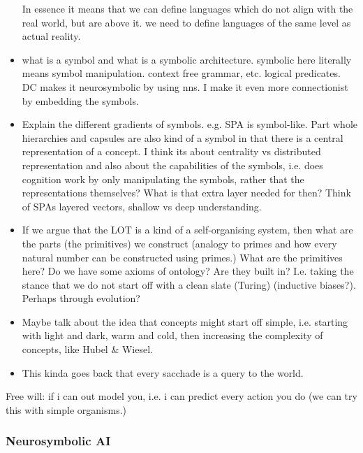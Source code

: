 \begin{itemize}
    In essence it means that we can define languages which do not align with the real world, but are above it. we need to define languages of the same level as actual reality. 
    \item what is a symbol and what is a symbolic architecture. symbolic here literally means symbol manipulation. context free grammar, etc. logical predicates. DC makes it neurosymbolic by using nns. I make it even more connectionist by embedding the symbols.
    \item Explain the different gradients of symbols. e.g. SPA is symbol-like. Part whole hierarchies and capsules are also kind of a symbol in that there is a central representation of a concept. I think its about centrality vs distributed representation and also about the capabilities of the symbols, i.e. does cognition work by only manipulating the symbols, rather that the representations themselves? What is that extra layer needed for then? Think of SPAs layered vectors, shallow vs deep understanding.
    \item If we argue that the LOT is a kind of a self-organising system, then what are the parts (the primitives) we construct (analogy to primes and how every natural number can be constructed using primes.) What are the primitives here? Do we have some axioms of ontology? Are they built in? I.e. taking the stance that we do not start off with a clean slate (Turing) (inductive biases?). Perhaps through evolution? 
    \item Maybe talk about the idea that concepts might start off simple, i.e. starting with light and dark, warm and cold, then increasing the complexity of concepts, like Hubel \& Wiesel. 
    \item This kinda goes back that every sacchade is a query to the world. 
\end{itemize}

Free will: if i can out model you, i.e. i can predict every action you do (we can try this with simple organisms.)


\subsubsection{Neurosymbolic AI}

